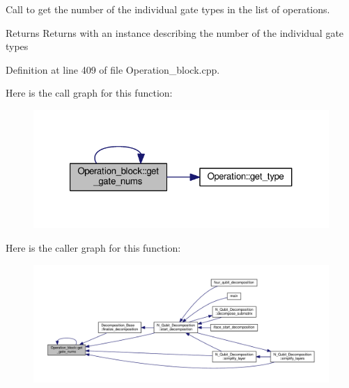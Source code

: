 Call to get the number of the individual gate types in the list of operations. 

\begin{DoxyReturn}{Returns}
Returns with an instance  describing the number of the individual gate types 
\end{DoxyReturn}


Definition at line 409 of file Operation\+\_\+block.\+cpp.



Here is the call graph for this function\+:
\nopagebreak
\begin{figure}[H]
\begin{center}
\leavevmode
\includegraphics[width=321pt]{class_operation__block_ac39ab782da3e34c8ec4acf6181fbc5f7_cgraph}
\end{center}
\end{figure}




Here is the caller graph for this function\+:
\nopagebreak
\begin{figure}[H]
\begin{center}
\leavevmode
\includegraphics[width=350pt]{class_operation__block_ac39ab782da3e34c8ec4acf6181fbc5f7_icgraph}
\end{center}
\end{figure}


